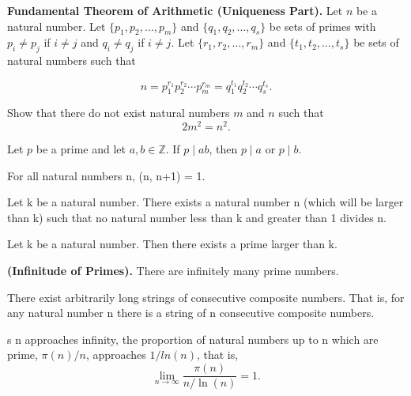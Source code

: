 \documentclass{article}
\theoremstyle{definition}
\newenvironment{manualtheorem}[1]{%
  \renewcommand{\thetheorem}{#1}%
  \theorem%
}{%
  \endtheorem%
}
\begin{document}
\begin{manualtheorem}{2.9}
	\textbf{Fundamental Theorem of Arithmetic (Uniqueness Part).}
	Let $n$ be a natural number. Let $\{p_{1}, p_{2}, \ldots, p_{m}\}$ and $\{q_{1}, q_{2}, \ldots, q_{s}\}$ be sets of primes with $p_{i} \neq p_{j}$ if $i \neq j$ and $q_{i} \neq q_{j}$ if $i \neq j$. Let $\{r_{1}, r_{2}, \ldots, r_{m}\}$ and $\{t_{1}, t_{2}, \ldots, t_{s}\}$ be sets of natural numbers such that

	\[
		n = p_{1}^{r_{1}} p_{2}^{r_{2}} \cdots p_{m}^{r_{m}}
		= q_{1}^{t_{1}} q_{2}^{t_{2}} \cdots q_{s}^{t_{s}}.
	\]
\end{manualtheorem}

\begin{manualtheorem}{2.19}
	Show that there do not exist natural numbers $m$ and $n$ such that
	\[
		2m^2 = n^2.
	\]
\end{manualtheorem}

\begin{manualtheorem}{2.27}
	Let $p$ be a prime and let $a, b \in \mathbb{Z}$. If $p \mid ab$, then $p \mid a$ or $p \mid b$.
\end{manualtheorem}

\begin{manualtheorem}{2.32}
	For all natural numbers n, (n, n+1) = 1.
\end{manualtheorem}

\begin{manualtheorem}{2.33}
	Let k be a natural number. There exists a natural number n (which will be larger than k) such that no natural number less than k and greater than 1 divides n.
\end{manualtheorem}
\begin{manualtheorem}{2.34}
	Let k be a natural number. Then there exists a prime larger than
	k.
\end{manualtheorem}
\begin{manualtheorem}{2.35}

	\textbf{(Infinitude of Primes).} There are infinitely many prime numbers.
\end{manualtheorem}

\begin{manualtheorem}{2.46}
	There exist arbitrarily long strings of consecutive composite numbers. That is, for any natural number n there is a string of n consecutive composite
	numbers.
\end{manualtheorem}

\begin{manualtheorem}
	As n approaches infinity, the proportion of natural numbers up to n which are prime, $\pi (n)/n$,
	approaches $1 / ln(n)$, that is,
	\[
		\lim_{n \to \infty} \frac{\pi(n)}{n / \ln(n)} = 1.
	\]
\end{manualtheorem}
\end{document}
